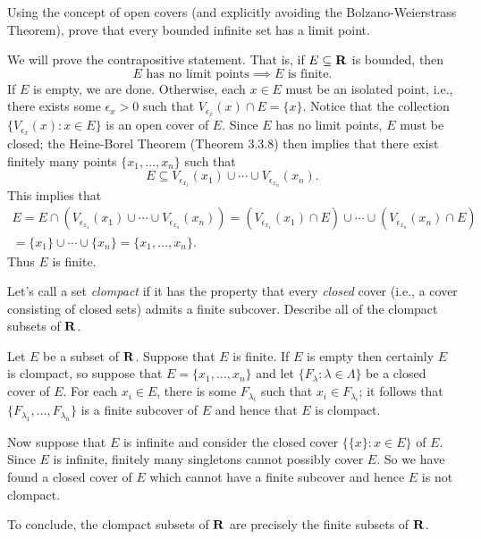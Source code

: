\documentclass{lew98_solutions}
\begin{document}
\begin{exercise}
\label{ex:3.3.12}
    Using the concept of open covers (and explicitly avoiding the Bolzano-Weierstrass Theorem), prove that every bounded infinite set has a limit point.
\end{exercise}

\begin{solution}
    We will prove the contrapositive statement. That is, if \( E \subseteq \mathbf{R} \) is bounded, then
    \[
        E \text{ has no limit points} \implies E \text{ is finite}.
    \]
    If \( E \) is empty, we are done. Otherwise, each \( x \in E \) must be an isolated point, i.e., there exists some \( \epsilon_x > 0 \) such that \( V_{\epsilon_x}(x) \cap E = \{ x \} \). Notice that the collection \( \{ V_{\epsilon_x}(x) : x \in E \} \) is an open cover of \( E \). Since \( E \) has no limit points, \( E \) must be closed; the Heine-Borel Theorem (Theorem 3.3.8) then implies that there exist finitely many points \( \{ x_1, \ldots, x_n \} \) such that
    \[
        E \subseteq V_{\epsilon_{x_1}}(x_1) \cup \cdots \cup V_{\epsilon_{x_n}}(x_n).
    \]
    This implies that
    \begin{multline*}
        E = E \cap (V_{\epsilon_{x_1}}(x_1) \cup \cdots \cup V_{\epsilon_{x_n}}(x_n)) = (V_{\epsilon_{x_1}}(x_1) \cap E) \cup \cdots \cup (V_{\epsilon_{x_n}}(x_n) \cap E) \\[2mm]
        = \{ x_1 \} \cup \cdots \cup \{ x_n \} = \{ x_1, \ldots, x_n \}.
    \end{multline*}
    Thus \( E \) is finite.
\end{solution}

\begin{exercise}
\label{ex:3.3.13}
    Let's call a set \textit{clompact} if it has the property that every \textit{closed} cover (i.e., a cover consisting of closed sets) admits a finite subcover. Describe all of the clompact subsets of \( \mathbf{R} \).
\end{exercise}

\begin{solution}
    Let \( E \) be a subset of \( \mathbf{R} \). Suppose that \( E \) is finite. If \( E \) is empty then certainly \( E \) is clompact, so suppose that \( E = \{ x_1, \ldots, x_n \} \) and let \( \{ F_{\lambda} : \lambda \in \Lambda \} \) be a closed cover of \( E \). For each \( x_i \in E \), there is some \( F_{\lambda_i} \) such that \( x_i \in F_{\lambda_i} \); it follows that \( \{ F_{\lambda_1}, \ldots, F_{\lambda_n} \} \) is a finite subcover of \( E \) and hence that \( E \) is clompact.

    Now suppose that \( E \) is infinite and consider the closed cover \( \{ \{ x \} : x \in E \} \) of \( E \). Since \( E \) is infinite, finitely many singletons cannot possibly cover \( E \). So we have found a closed cover of \( E \) which cannot have a finite subcover and hence \( E \) is not clompact.

    To conclude, the clompact subsets of \( \mathbf{R} \) are precisely the finite subsets of \( \mathbf{R} \).
\end{solution}
\end{document}
